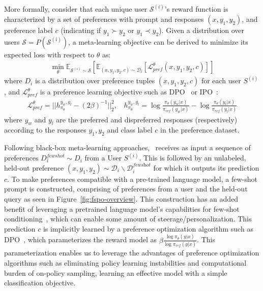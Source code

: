 More formally, consider that each unique user $\mathcal{S}^{(i)}$'s reward function is characterized by a set of preferences with prompt and responses $(x, y_1, y_2)$, and preference label $c$ (indicating if $y_1 \succ y_2$ or $y_1 \prec y_2$). Given a distribution over users $\mathcal{S}=P(\mathcal{S}^{(i)})$, a meta-learning objective can be derived to minimize its expected loss with respect to $\theta$ as:
\begin{align}
    \min_{\theta} \mathbb{E}_{\mathcal{S}^{(i)} \sim \mathcal{S}} \left[\mathbb{E}_{(x,y_1,y_2,c) \sim \mathcal{D}_i}\left[\mathcal{L}^{\theta}_{\textit{pref}}\left(x,y_1,y_2,c\right)\right]\right]
    \label{eq:metalearn-obj}
\end{align}
where $D_i$ is a distribution over preference tuples $(x,y_1,y_2,c)$ for each user $S^{(i)}$, and $\mathcal{L}^{\theta}_{\textit{pref}}$ is a preference learning objective such as DPO~\citep{rafailov2023direct} or IPO~\citep{2023arXiv231012036G}:
\begin{align}
    \mathcal{L}^{\theta}_{\textit{pref}} = || h_{\pi_\theta}^{y_w,y_l} - (2\beta)^{-1}||^2_{2}, ~~~~
    h_{\pi_\theta}^{y_w,y_l} = \log \frac{\pi_\theta(y_w| x)}{\pi_{\textit{ref}}(y_w| x)} - \log \frac{\pi_\theta(y_l| x)}{\pi_{\textit{ref}}(y_l| x)}
    \label{eq:ipo-obj}
\end{align}
where $y_w$ and $y_l$ are the preferred and dispreferred responses (respectively) according to the responses $y_1,y_2$ and class label $c$ in the preference dataset.

Following black-box meta-learning approaches, \methodname\ receives as input a sequence of preferences $D_i^{fewshot} \sim D_i$ from a User $S^{(i)}$. This is followed by an unlabeled, held-out preference $(x,y_1,y_2) \sim \mathcal{D}_i \backslash \mathcal{D}_i^{\textit{fewshot}}$ for which it outputs its prediction $c$. To make preferences compatible with a pre-trained language model, a few-shot prompt is constructed, comprising of preferences from a user and the held-out query as seen in Figure~\ref{fig:fspo-overview}. This construction has an added benefit of leveraging a pretrained language model's capabilities for few-shot conditioning~\citep{brown2020language}, which can enable some amount of steerage/personalization. This prediction $c$ is implicitly learned by a preference optimization algorithm such as DPO~\citep{rafailov2023direct}, which parameterizes the reward model as $\beta\frac{\log \pi_{\theta}(y|x)}{\log \pi_{\textit{ref}}(y|x)}$. This parameterization enables us to leverage the advantages of preference optimization algorithms such as eliminating policy learning instabilities and computational burden of on-policy sampling, learning an effective model with a simple classification objective.


